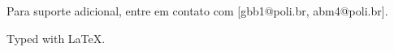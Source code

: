 \documentclass[a4paper,12pt]{article}
\begin{document}
Para suporte adicional, entre em contato com [gbb1@poli.br, abm4@poli.br].

%



\vfill

Typed with \LaTeX.
\end{document}

